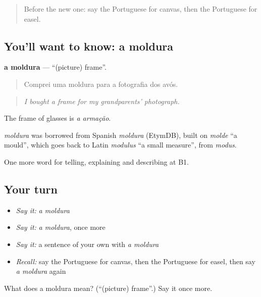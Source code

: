 \label{lesson:PT-C505-moldura}



\begin{quote}
Before the new one: say the Portuguese for canvas, then the Portuguese for easel.
\end{quote}

\subsection*{You'll want to know: a moldura}
\textbf{a moldura} — \textquotedblleft{}(picture) frame\textquotedblright{}.

\begin{quote}
Comprei uma moldura para a fotografia dos avós.
\end{quote}

\begin{quote}
\emph{I bought a frame for my grandparents' photograph.}
\end{quote}

The frame of glasses is \emph{a armação}.

\begin{cousinweb}
\emph{moldura} was borrowed from Spanish \emph{moldura} (EtymDB), built on \emph{molde} \textquotedblleft{}a mould\textquotedblright{}, which goes back to Latin \emph{modulus} \textquotedblleft{}a small measure\textquotedblright{}, from \emph{modus}.
\end{cousinweb}

\begin{grammarlens}[title={What you've built}]
One more word for telling, explaining and describing at B1.
\end{grammarlens}

\subsection*{Your turn}
\begin{itemize}
\raggedright
  \item \emph{Say it:} \emph{a moldura}
  \item \emph{Say it:} \emph{a moldura}, once more
  \item \emph{Say it:} a sentence of your own with \emph{a moldura}
  \item \emph{Recall:} say the Portuguese for canvas, then the Portuguese for easel, then say \emph{a moldura} again
\end{itemize}

\begin{tcolorbox}[breakable,colback=teal!4,colframe=teal!35!black,title={Before you move on}]
What does a moldura mean? (\textquotedblleft{}(picture) frame\textquotedblright{}.) Say it once more.
\end{tcolorbox}
